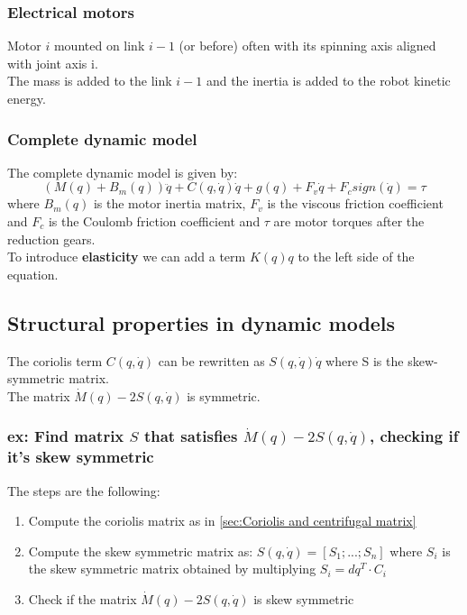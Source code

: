 \documentclass[a4paper,12pt]{article}
\begin{document}
\subsubsection{Electrical motors}
Motor $i$ mounted on link $i-1$ (or before) often with 
its spinning axis aligned with joint axis i.\\
The mass is added to the link $i-1$ and the inertia is
added to the robot kinetic energy.
\subsubsection{Complete dynamic model}
The complete dynamic model is given by:
\begin{equation}
    (M(q)+B_m(q))\ddot{q} + C(q,\dot{q})\dot{q} + g(q) + F_v\dot{q} + F_c sign(\dot{q}) = \tau
\end{equation}
where $B_m(q)$ is the motor inertia matrix, $F_v$ is the 
viscous friction coefficient and $F_c$ is the Coulomb friction 
coefficient and $\tau$ are motor torques after the reduction gears.\\
To introduce \textbf{elasticity} we can add a term $K(q)q$ to the
left side of the equation.
\subsection{Structural properties in dynamic models}
The coriolis term $C(q,\dot{q})$ can be  rewritten as $S(q,\dot{q})\dot{q}$ where 
S is the skew-symmetric matrix.\\
The matrix $\dot{M}(q)-2S(q,\dot{q})$ is symmetric.
\subsubsection{ex: Find matrix $S$ that satisfies $\dot{M}(q)-2S(q,\dot{q})$, checking if it's skew symmetric}
The steps are the following:
\begin{enumerate}
    \item Compute the coriolis matrix as in \ref{sec:Coriolis and centrifugal matrix}
    \item Compute the skew symmetric matrix as: $S(q,\dot{q}) = [S_1;...;S_n]$ where $S_i$ is 
    the skew symmetric matrix obtained by multiplying $S_i = dq^T \cdot C_i$
    \item Check if the matrix $\dot{M}(q)-2S(q,\dot{q})$ is skew symmetric
\end{enumerate}
\end{document}
